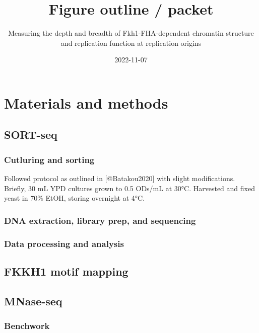 \documentclass[
]{article}
\title{Figure outline / packet}
\subtitle{Measuring the depth and breadth of Fkh1-FHA-dependent chromatin structure and replication function at replication origins}
\author{}
\date{\vspace{-2.5em}2022-11-07}
\begin{document}
\maketitle

\hypertarget{materials-and-methods}{%
\section{Materials and methods}\label{materials-and-methods}}

\hypertarget{sort-seq}{%
\subsection{SORT-seq}\label{sort-seq}}

\hypertarget{cutluring-and-sorting}{%
\subsubsection{Cutluring and sorting}\label{cutluring-and-sorting}}

Followed protocol as outlined in {[}@Batakou2020{]} with slight modifications. Briefly, 30 mL YPD cultures grown to 0.5 ODs/mL at 30°C. Harvested and fixed yeast in 70\% EtOH, storing overnight at 4°C.

\hypertarget{dna-extraction-library-prep-and-sequencing}{%
\subsubsection{DNA extraction, library prep, and sequencing}\label{dna-extraction-library-prep-and-sequencing}}

\hypertarget{data-processing-and-analysis}{%
\subsubsection{Data processing and analysis}\label{data-processing-and-analysis}}

\hypertarget{fkkh1-motif-mapping}{%
\subsection{FKKH1 motif mapping}\label{fkkh1-motif-mapping}}

\hypertarget{mnase-seq}{%
\subsection{MNase-seq}\label{mnase-seq}}

\hypertarget{benchwork}{%
\subsubsection{Benchwork}\label{benchwork}}
\end{document}
